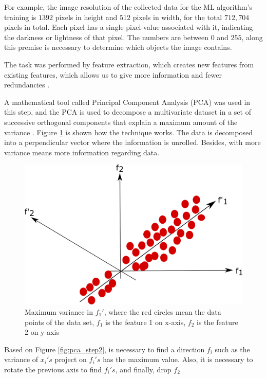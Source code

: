 For example, the image resolution of the collected data for the ML algorithm's training is $1392$ pixels in height and $512$ pixels in width, for the total $712,704$ pixels in total. Each pixel has a single pixel-value associated with it, indicating the darkness or lightness of that pixel. The numbers are between $0$ and $255$, along this premise is necessary to determine which objects the image contains.

The task was performed by feature extraction, which creates new features from existing features, which allows us to give more information and fewer redundancies \cite{wang2019data}.

A mathematical tool called Principal Component Analysis (PCA) was used in this step, and the PCA is used to decompose a multivariate dataset in a set of successive orthogonal components that explain a maximum amount of the variance \cite{pedregosa2011scikit}. Figure \ref{fig:pca_step1} is shown how the technique works. The data is decomposed into a perpendicular vector where the information is unrolled. Besides, with more variance means more information regarding data.

\begin{figure}[H]
\centering
\includegraphics[scale=0.7]{imagens/pca1.png}
\caption{Maximum variance in $f_1'$, where the red circles mean the data points of the data set, $f_1$ is the feature 1 on x-axis, $f_2$ is the feature 2 on y-axis}
\label{fig:pca_step1}
\end{figure}


Based on Figure \ref{fig:pca_step2}, is necessary to find a direction $f_i$ such as the variance of $x_i's$ project on $f_i's$ has the maximum value. Also, it is necessary to rotate the previous axis to find $f_i' s$, and finally, drop $f_2$

